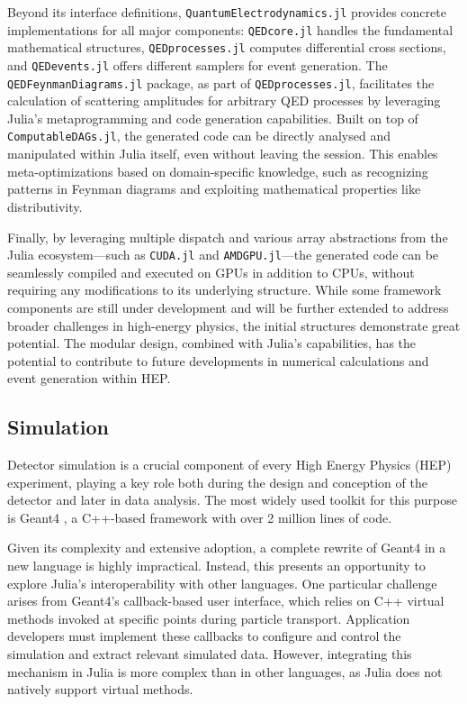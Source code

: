 \documentclass{webofc}
\begin{document}
Beyond its interface definitions, \texttt{QuantumElectrodynamics.jl} provides
concrete implementations for all major components: \texttt{QEDcore.jl} handles
the fundamental mathematical structures, \texttt{QEDprocesses.jl} computes
differential cross sections, and \texttt{QEDevents.jl} offers different samplers
for event generation. The \texttt{QEDFeynmanDiagrams.jl} package, as part of
\texttt{QEDprocesses.jl}, facilitates the calculation of scattering amplitudes
for arbitrary QED processes by leveraging Julia's metaprogramming and code
generation capabilities. Built on top of \texttt{ComputableDAGs.jl}, the
generated code can be directly analysed and manipulated within Julia itself,
even without leaving the session. This enables meta-optimizations based on
domain-specific knowledge, such as recognizing patterns in Feynman diagrams and
exploiting mathematical properties like distributivity.

Finally, by leveraging multiple dispatch and various array abstractions from the
Julia ecosystem—such as \texttt{CUDA.jl} and \texttt{AMDGPU.jl}—the generated
code can be seamlessly compiled and executed on GPUs in addition to CPUs,
without requiring any modifications to its underlying structure. While some
framework components are still under development and will be further extended to
address broader challenges in high-energy physics, the initial structures
demonstrate great potential. The modular design, combined with Julia's
capabilities, has the potential to contribute to future developments in
numerical calculations and event generation within HEP.


\subsection{Simulation}
\label{sec:simulation}

Detector simulation is a crucial component of every High Energy Physics (HEP)
experiment, playing a key role both during the design and conception of the
detector and later in data analysis. The most widely used toolkit for this
purpose is Geant4 \cite{GEANT4:2002zbu}, a C++-based framework with over 2
million lines of code.

Given its complexity and extensive adoption, a complete rewrite of Geant4 in a
new language is highly impractical. Instead, this presents an opportunity to
explore Julia's interoperability with other languages. One particular challenge
arises from Geant4's callback-based user interface, which relies on C++ virtual
methods invoked at specific points during particle transport. Application
developers must implement these callbacks to configure and control the
simulation and extract relevant simulated data. However, integrating this
mechanism in Julia is more complex than in other languages, as Julia does not
natively support virtual methods.
\end{document}
